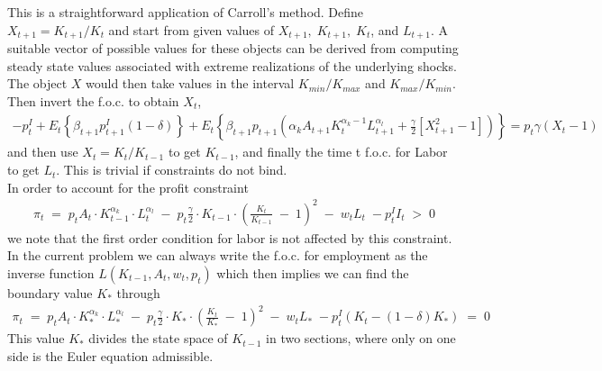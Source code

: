 \documentclass[danish]{article}
\begin{document}
This is a straightforward application of Carroll's method. Define $X_{t+1}=K_{t+1}/K_{t}$ and start from given values of $X_{t+1},\;K_{t+1},\;K_{t}$, and $L_{t+1}$. A suitable vector of possible values  for these objects can be derived from computing steady state values associated with extreme realizations of the underlying shocks. The object $X$ would then take values in the interval $K_{min}/K_{max}$ and $K_{max}/K_{min}$. Then invert the f.o.c. to obtain $X_{t}$,
\begin{gather*}
-p_{t}^{I}+E_{t}\left\{ \beta_{t+1}p_{t+1}^{I}\left(1-\delta\right)\right\} +E_{t}\left\{ \beta_{t+1} p_{t+1} \left( \alpha_k A_{t+1} K_{t}^{\alpha_k-1}L_{t+1}^{\alpha_l} + \frac{\gamma}{2}\left[X_{t+1}^{2}-1\right]\right) \right\} =p_{t} \gamma\left(X_{t}-1\right) 
\end{gather*}
and then use $X_{t}=K_{t}/K_{t-1}$ to get $K_{t-1}$, and finally the time t f.o.c. for Labor to get $L_{t}$. This is trivial if constraints do not bind.\\
In order to account for the profit constraint 
\begin{gather*}
\pi_t \;= \; p_t A_t \cdot K^{\alpha_k}_{t-1} \cdot L^{\alpha_l}_{t}   \;  - \; p_t \frac{\gamma}{2}\cdot K_{t-1}\cdot \left(  \frac{K_t}{K_{t-1}}  \; -\;  1   \right)^2 \;  - \; w_t L_t \; - p^I_t I_t \; > \; 0
\end{gather*}
we note that the first order condition for labor is not affected by this constraint. In the current problem we can always write the f.o.c. for employment as the inverse function $L\left( K_{t-1},A_t,w_t,p_t \right)$ which then implies we can find the boundary value $K_{*}$ through
\begin{gather*}
\pi_t \;= \; p_t A_t \cdot K^{\alpha_k}_{*} \cdot L^{\alpha_l}_{*}   \;  - \; p_t \frac{\gamma}{2}\cdot K_{*}\cdot \left(  \frac{K_t}{K_{*}}  \; -\;  1   \right)^2 \;  - \; w_t L_{*} \; - p^I_t \left(K_t - (1-\delta) K_{*} \right)\; = \; 0
\end{gather*}
This value $K_{*}$ divides the state space of $K_{t-1}$ in two sections, where only on one side is the Euler equation admissible.
\end{document}
